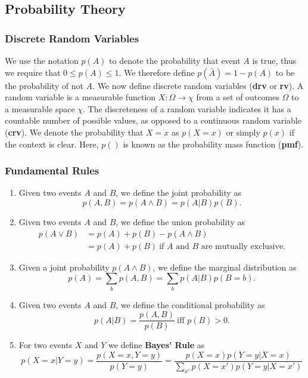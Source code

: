 \documentclass[10pt,a4paper]{article}
\numberwithin{equation}{section}
\theoremstyle{plain}
\theoremstyle{definition}
\theoremstyle{own}
\begin{document}
\subsection{Probability Theory}
\subsubsection{Discrete Random Variables}
We use the notation $p(A)$ to denote the probability that event $A$ is true, thus we require that $0 \leq p(A) \leq 1$. We therefore define $p(\bar{A}) = 1 - p(A)$ to be the probability of not $A$. We now define discrete random variables (\textbf{drv} or \textbf{rv}). A random variable is a measurable function $X : \Omega \to \chi$ from a set of outcomes $\Omega$ to a measurable space $\chi$. The discreteness of a random variable indicates it has a countable number of possible values, as opposed to a continuous random variable (\textbf{crv}). We denote the probability that $X = x$ as $p(X = x)$ or simply $p(x)$ if the context is clear. Here, $p()$ is known as the probability mass function (\textbf{pmf}).
\subsubsection{Fundamental Rules}
\begin{enumerate}
\item Given two events $A$ and $B$, we define the joint probability as
\begin{equation}
p(A,B) = p(A \wedge B) = p(A|B)p(B).
\end{equation}
\item Given two events $A$ and $B$, we define the union probability as
\begin{align}
p(A \vee B) & = p(A) + p(B) - p(A \wedge B) \\
& = p(A) + p(B)~\text{if $A$ and $B$ are mutually exclusive}.
\end{align}
\item Given a joint probability $p(A \wedge B)$, we define the marginal distribution as
\begin{equation}
p(A) = \sum_{b} p(A, B) = \sum_b p(A|B)p(B = b).
\end{equation}
\item Given two events $A$ and $B$, we define the conditional probability as
\begin{equation}
p(A|B) = \frac{p(A,B)}{p(B)}~\text{iff $p(B) > 0$}.
\end{equation}
\item For two events $X$ and $Y$ we define \textbf{Bayes' Rule} as
\begin{equation}
p(X = x | Y = y) = \frac{p(X = x, Y = y)}{p(Y = y)} = \frac{p(X = x)p(Y = y | X = x)}{\sum_{x'} p(X = x')p(Y = y | X = x')}
\end{equation}
\end{enumerate}
\end{document}
